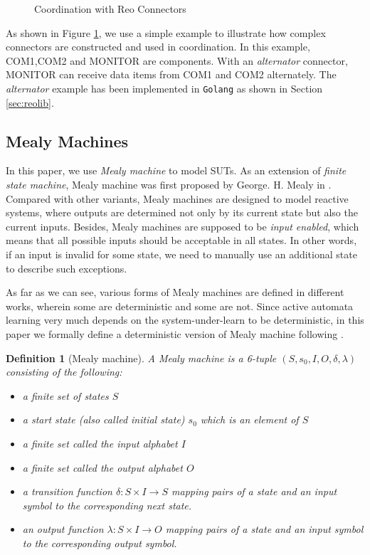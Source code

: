 \documentclass[conference, a4paper]{IEEEtran}
\newtheorem{definition}{Definition}
\begin{document}
\begin{figure}[ht]
  \begin{center}
    
  \end{center}
  \caption{Coordination with Reo Connectors}
  \label{fig:reoconnector}
\end{figure}

As shown in Figure \ref{fig:reoconnector}, we use a simple example to illustrate how complex
connectors are constructed and used in coordination. In this example, COM1,COM2 and
MONITOR are components. With an \emph{alternator} connector, MONITOR can receive data items from
COM1 and COM2 alternately. The \emph{alternator} example has been implemented in \texttt{Golang} as
shown in Section \ref{sec:reolib}.


\subsection{Mealy Machines}

In this paper, we use \emph{Mealy machine} to model SUTs.
As an extension of \emph{finite state machine}, Mealy machine was first proposed by George. H. Mealy
in \cite{George1955A}. Compared with other variants, Mealy machines are designed to model
reactive systems, where outputs are determined not only by its current state but also the current
inputs. Besides, Mealy machines are supposed to be \emph{input enabled}, which means that all
possible inputs should be acceptable in all states. In other words, if an input is invalid for some
state, we need to manually use an additional state to describe such exceptions.

As far as we can see, various forms of Mealy machines are defined in different works, wherein some
are deterministic and some are not. Since active automata learning very much depends on the
system-under-learn to be deterministic, in this paper we formally define a deterministic version of
Mealy machine following \cite{DBLP:conf/sfm/SteffenHM11}.

\begin{definition}[Mealy machine]
  A Mealy machine is a 6-tuple $(S, s_0, I, O, \delta, \lambda)$ consisting of the following:
  \begin{itemize}
    \item[-] a finite set of states $S$
    \item[-] a start state (also called initial state) $s_0$ which is an element of $S$
    \item[-] a finite set called the input alphabet $I$
    \item[-] a finite set called the output alphabet $O$
    \item[-] a transition function $\delta : S \times I \rightarrow S$ mapping pairs of a
      state and an input symbol to the corresponding next state.
    \item[-] an output function $\lambda : S \times I \rightarrow O$ mapping pairs
      of a state and an input symbol to the corresponding output symbol.
  \end{itemize}
\end{definition}
\end{document}
